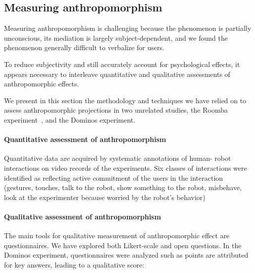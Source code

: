 \documentclass{frontiersSCNS} %
\begin{document}
\subsection{Measuring anthropomorphism}


Measuring anthropomorphism is challenging because the phenomenon is partially
unconscious, its mediation is largely subject-dependent, and we found the
phenomenon generally difficult to verbalize for users.

To reduce subjectivity and still accurately account for psychological effects,
it appears necessary to interleave quantitative and qualitative assessments of
anthropomorphic effects.

We present in this section the methodology and techniques we have relied on to
assess anthropomorphic projections in two unrelated studies, the Roomba
experiment~\cite{fink_living_2013}, and the Dominos experiment.

\paragraph{Quantitative assessment of anthropomorphism} Quantitative data are
acquired by systematic annotations of human- robot interactions on video records
of the experiments. Six classes of interactions were identified as reflecting
active commitment of the users in the interaction (gestures, touches, talk to
the robot, show something to the robot, misbehave, look at the experimenter
because worried by the robot's behavior)

\paragraph{Qualitative assessment of anthropomorphism} The main tools for
qualitative measurement of anthropomorphic effect are questionnaires. We have
explored both Likert-scale and open questions. In the Dominos experiment,
questionnaires were analyzed such as points are attributed for key answers,
leading to a qualitative score:
\end{document}
